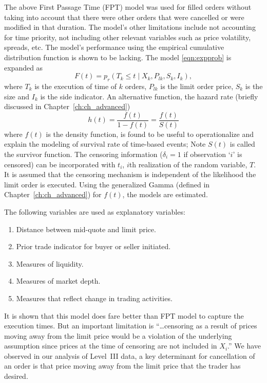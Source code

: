 The above First Passage Time (FPT) model was used for filled orders without taking into account that there were other orders that were cancelled or were modified in that duration. The model's other limitations include not accounting for time priority, not including other relevant variables such as price volatility, spreads, etc. The model's performance using the empirical cumulative distribution function is shown to be lacking. The model \eqref{eqn:expprob} is expanded as
	\begin{equation} \label{eqn:cumexpmodel}
	F(t)=p_r(T_k \leq t \;|\; X_k,P_{lk}, S_k, I_k),
	\end{equation}
where $T_k$ is the execution of time of $k$ orders, $P_{lk}$ is the limit order price, $S_k$ is the size and $I_k$ is the side indicator. An alternative function, the hazard rate (briefly discussed in Chapter~\ref{ch:ch_advanced})
	\begin{equation} \label{eqn:hazard}
	h(t)=\dfrac{f(t)}{1-f(t)}= \dfrac{f(t)}{S(t)}
	\end{equation}
where $f(t)$ is the density function, is found to be useful to operationalize and explain the modeling of survival rate of time-based events; Note $S(t)$ is called the survivor function. The censoring information ($\delta_i= 1$ if observation `$i$' is censored) can be incorporated with $t_i$, $i$th realization of the random variable, $T$. It is assumed that the censoring mechanism is independent of the likelihood the limit order is executed. Using the generalized Gamma (defined in Chapter~\ref{ch:ch_advanced}) for $f(t)$, the models are estimated.


The following variables are used as explanatory variables:
        \begin{enumerate}[--]
        \item Distance between mid-quote and limit price.
        \item Prior trade indicator for buyer or seller initiated.
        \item Measures of liquidity.
        \item Measures of market depth.
        \item Measures that reflect change in trading activities. 
        \end{enumerate}
It is shown that this model does fare better than FPT model to capture the execution times. But an important limitation is ``\dots censoring as a result of prices moving away from the limit price would be a violation of the underlying assumption since prices at the time of censoring are not included in $X_i$.'' We have observed in our analysis of Level~III data, a key determinant for cancellation of an order is that price moving away from the limit price that the trader has desired. \twomedskip


